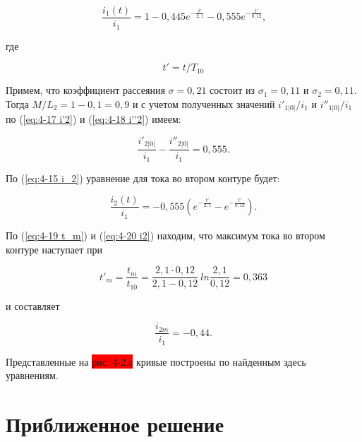 \begin{small}
	\begin{equation*}    
        \frac{i_1(t)}{i_1}=1-0,445e^{-\frac{t'}{2,1}}-0,555e^{-\frac{t'}{0,12}}\text{,}
    \end{equation*}
    
    где
    
    \begin{equation*}    
        t'=t/T_{10}
    \end{equation*}
    
    Примем, что коэффициент рассеяния $ \sigma = 0,21 $ состоит из $ \sigma_1 = 0,11 $ и $ \sigma_2 = 0,11 $. Тогда $ M/L_2 = 1-0,1=0,9 $ и с учетом полученных значений $ i'_{1|0|} / i_1 $ и	$ i''_{1|0|} / i_1 $ по (\ref{eq:4-17 i'2}) и (\ref{eq:4-18 i''2}) имеем:
    
    \begin{equation*}    
        \frac{i'_{2|0|}}{i_1} - \frac{i''_{2|0|}}{i_1} = 0,555\text{.}
    \end{equation*}
	
	По (\ref{eq:4-15 i_2}) уравнение для тока во втором контуре будет:
	
	\begin{equation*}    
        \frac{i_2(t)}{i_1} = - 0,555(e^{-\frac{t'}{2,1}} - e^{-\frac{t'}{0,12}})\text{.}
    \end{equation*}
	
	По (\ref{eq:4-19 t_m}) и (\ref{eq:4-20 i2}) находим, что максимум тока во втором контуре наступает при
	
	\begin{equation*}    
        t'_m=\frac{t_m}{t_{10}}=\frac{2,1 \cdot 0,12}{2,1 - 0,12}~ln\frac{2,1}{0,12}=0,363
    \end{equation*}
    
    и составляет 
    
    \begin{equation*}    
        \frac{i_{2m}}{i_1} = -0,44\text{.}
    \end{equation*}
	
	Представленные на \colorbox{red}{рис. 4-2,а} кривые построены по найденным здесь уравнениям.
	
\vspace{1pc}		
	
\end{small}

\section{Приближенное решение}
\label{sec:4-4}

